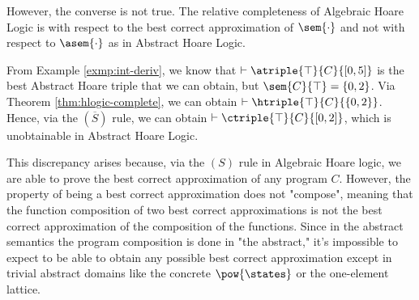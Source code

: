 However, the converse is not true. The relative completeness of Algebraic Hoare
Logic is with respect to the best correct approximation of $\sem{\cdot}$ and not
with respect to $\asem{\cdot}$ as in Abstract Hoare Logic.

\begin{example}[Counterexample]
  From Example \ref{exmp:int-deriv}, we know that $\vdash \atriple{\top}{C}{[0, 5]}$ is
  the best Abstract Hoare triple that we can obtain, but $\sem{C}{\top} = \{0,
  2\}$. Via Theorem \ref{thm:hlogic-complete}, we can obtain
  $\vdash \htriple{\top}{C}{\{0, 2\}}$. Hence, via the $(\overline{S})$ rule, we can
  obtain $\vdash \ctriple{\top}{C}{[0, 2]}$, which is unobtainable in Abstract Hoare
  Logic.
\end{example}

This discrepancy arises because, via the $(S)$ rule in Algebraic Hoare logic,
we are able to prove the best correct approximation of any program $C$. However, the 
property of being a best correct approximation does not "compose",
meaning that the function composition of two best correct approximations is not
the best correct approximation of the composition of the functions. Since in the
abstract semantics the program composition is done in "the abstract," it's
impossible to expect to be able to obtain any possible best correct
approximation except in trivial abstract domains like the concrete
$\pow{\states}$ or the one-element lattice.

